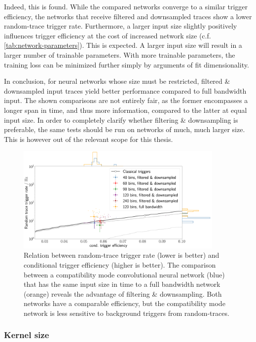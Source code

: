 Indeed, this is found. While the compared networks converge to a similar trigger efficiency, the networks that receive filtered and downsampled traces show a lower 
random-trace trigger rate. Furthermore, a larger input size slightly positively influences trigger efficiency at the cost of increased network size (c.f. 
\autoref{tab:network-parameters}). This is expected. A larger input size will result in a larger number of trainable parameters. With more trainable parameters, 
the training loss can be minimized further simply by arguments of fit dimensionality. 

In conclusion, for neural networks whose size must be restricted, filtered \& downsampled input traces yield better performance compared to full bandwidth input. 
The shown comparisons are not entirely fair, as the former encompasses a longer span in time, and thus more information, compared to the latter at equal input 
size. In order to completely clarify whether filtering \& downsampling is preferable, the same tests should be run on networks of much, much larger size. This is
however out of the relevant scope for this thesis.

\begin{figure}
	\centering
	\includegraphics[width=0.9\textwidth]{./plots/CNN_input_size.png}
	\caption{Relation between random-trace trigger rate (lower is better) and conditional trigger efficiency (higher is better). The comparison between a 
	compatibility mode convolutional neural network (blue) that has the same input size in time to a full bandwidth network (orange) reveals the advantage of 
	filtering \& downsampling. Both networks have a comparable efficiency, but the compatibility mode network is less sensitive	to background triggers from 
	random-traces.}
	\label{fig:CNN-input-size}
\end{figure}

\subsubsection{Kernel size}
\label{sssec:kernel-size}

